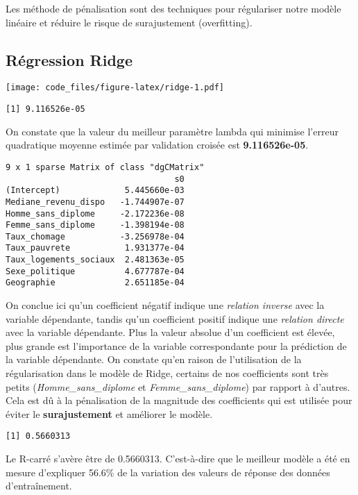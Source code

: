 \documentclass[
]{article}
\begin{document}
Les méthode de pénalisation sont des techniques pour régulariser notre
modèle linéaire et réduire le risque de surajustement (overfitting).

\hypertarget{ruxe9gression-ridge}{%
\subsection{Régression Ridge}\label{ruxe9gression-ridge}}

\texttt{[image: code\_files/figure-latex/ridge-1.pdf]}

\begin{verbatim}
[1] 9.116526e-05
\end{verbatim}

On constate que la valeur du meilleur paramètre lambda qui minimise
l'erreur quadratique moyenne estimée par validation croisée est
\textbf{9.116526e-05}.

\begin{verbatim}
9 x 1 sparse Matrix of class "dgCMatrix"
                                  s0
(Intercept)             5.445660e-03
Mediane_revenu_dispo   -1.744907e-07
Homme_sans_diplome     -2.172236e-08
Femme_sans_diplome     -1.398194e-08
Taux_chomage           -3.256978e-04
Taux_pauvrete           1.931377e-04
Taux_logements_sociaux  2.481363e-05
Sexe_politique          4.677787e-04
Geographie              2.651185e-04
\end{verbatim}

On conclue ici qu'un coefficient négatif indique une \emph{relation
inverse} avec la variable dépendante, tandis qu'un coefficient positif
indique une \emph{relation directe} avec la variable dépendante. Plus la
valeur absolue d'un coefficient est élevée, plus grande est l'importance
de la variable correspondante pour la prédiction de la variable
dépendante. On constate qu'en raison de l'utilisation de la
régularisation dans le modèle de Ridge, certains de nos coefficients
sont très petits (\emph{Homme\_sans\_diplome} et
\emph{Femme\_sans\_diplome}) par rapport à d'autres. Cela est dû à la
pénalisation de la magnitude des coefficients qui est utilisée pour
éviter le \textbf{surajustement} et améliorer le modèle.

\begin{verbatim}
[1] 0.5660313
\end{verbatim}

Le R-carré s'avère être de 0.5660313. C'est-à-dire que le meilleur
modèle a été en mesure d'expliquer 56.6\% de la variation des valeurs de
réponse des données d'entraînement.
\end{document}
